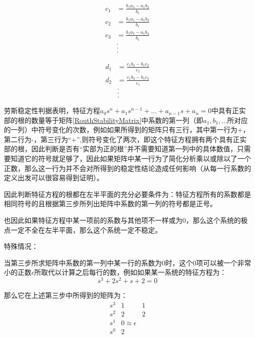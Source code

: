 \documentclass{article}
\numberwithin{equation}{section}
\numberwithin{figure}{section}
\begin{document}
\begin{equation}
    \begin{split}
        c_1&=\frac{b_1a_3-a_1b_2}{b_1}\\
        c_2&=\frac{b_1a_5-a_1b_3}{b_1}\\
        c_3&=\frac{b_1a_7-a_1b_4}{b_1}\\
        &.\\
        &.\\
        &.
    \end{split}
\end{equation}

\begin{equation}
    \begin{split}
        d_1&=\frac{c_1b_2-b_1c_2}{c_1}\\
        d_2&=\frac{c_1b_3-b_1c_3}{c_1}\\
        &.\\
        &.\\
        &.
    \end{split}
\end{equation}

劳斯稳定性判据表明，特征方程$a_0s^n+a_1s^{n-1}+...+a_{n-1}s+a_n=0$中具有正实部的根的数量等于矩阵\ref{RouthStabilityMatrix}中系数的第一列（即$a_1,b_1,...$所对应的一列）中符号变化的次数，例如如果所得到的矩阵只有三行，其中第一行为+，第二行为-，第三行为“+”,则符号变化了两次，即这个特征方程拥有两个具有正实部的根，因此判断是否有“实部为正的根”并不需要知道第一列中的具体数值，只需要知道它的符号就足够了，因此如果矩阵中某一行为了简化分析乘以或除以了一个正数，那么这一行为并不会对所得到的稳定性结论造成任何影响（从每一行系数的定义出发可以很容易得到证明）。

因此判断特征方程的根都在左半平面的充分必要条件为：特征方程所有的系数都是相同符号的且根据第三步所列出矩阵中系数的第一列的符号都是正号。

也因此如果特征方程中某一项前的系数与其他项不一样或为0，那么这个系统的极点一定不全在左半平面，那么这个系统一定不稳定。

特殊情况：

当第三步所求矩阵中系数的第一列中某一行的系数为0时，这个0项可以被一个非常小的正数$\epsilon$所取代以计算之后每行的数，例如如果某一系统的特征方程为：
\begin{equation}
    s^3+2s^2+s+2=0
\end{equation}

那么它在上述第三步中所得到的矩阵为：
\begin{equation}
    \begin{matrix}
        s^3&1&1\\
        s^2&2&2\\
        s^1&0≈\epsilon\\
        s^0&2
    \end{matrix}
\end{equation}
\end{document}

